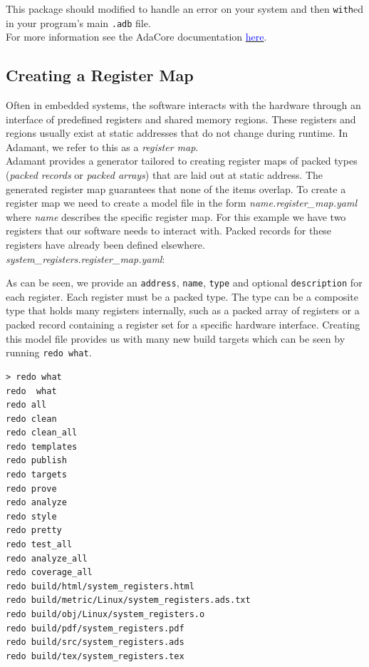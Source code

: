 This package should modified to handle an error on your system and then \texttt{with}ed in your program's main \texttt{.adb} file. \\

For more information see the AdaCore documentation \href{https://docs.adacore.com/gnathie_ug-docs/html/gnathie_ug/gnathie_ug/the_predefined_profiles.html#exceptions-and-the-last-chance-handler-zfp-and-ravenscar-sfp}{\textcolor{blue}{here}}.

\subsection{Creating a Register Map} \label{Creating a Register Map}

Often in embedded systems, the software interacts with the hardware through an interface of predefined registers and shared memory regions. These registers and regions usually exist at static addresses that do not change during runtime. In Adamant, we refer to this as a \textit{register map}. \\

Adamant provides a generator tailored to creating register maps of packed types (\textit{packed records} or \textit{packed arrays}) that are laid out at static address. The generated register map guarantees that none of the items overlap. To create a register map we need to create a model file in the form \textit{name.register\_map.yaml} where \textit{name} describes the specific register map. For this example we have two registers that our software needs to interact with. Packed records for these registers have already been defined elsewhere. \\

\textit{system\_registers.register\_map.yaml}:

As can be seen, we provide an \texttt{address}, \texttt{name}, \texttt{type} and optional \texttt{description} for each register. Each register must be a packed type. The type can be a composite type that holds many registers internally, such as a packed array of registers or a packed record containing a register set for a specific hardware interface. Creating this model file provides us with many new build targets which can be seen by running \texttt{redo what}.

\vspace{5mm} %
\begin{verbatim}
> redo what
redo  what
redo all
redo clean
redo clean_all
redo templates
redo publish
redo targets
redo prove
redo analyze
redo style
redo pretty
redo test_all
redo analyze_all
redo coverage_all
redo build/html/system_registers.html
redo build/metric/Linux/system_registers.ads.txt
redo build/obj/Linux/system_registers.o
redo build/pdf/system_registers.pdf
redo build/src/system_registers.ads
redo build/tex/system_registers.tex
\end{verbatim}
\vspace{5mm} %


